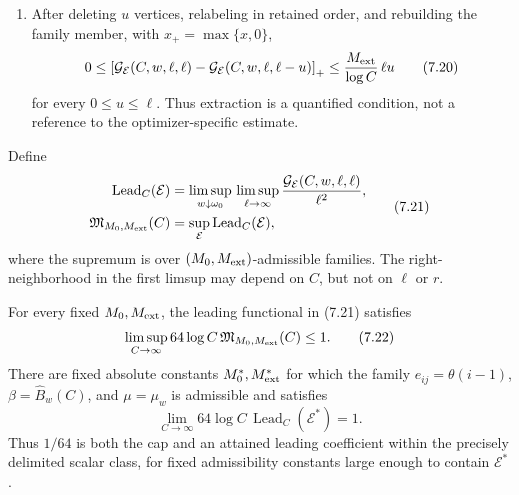 \begin{definition}
\begin{enumerate}[label=(A\arabic*)]
\[
 \mathcal G_{\mathcal E}(C,w,\ell,r)
 =\frac1d\left[
 \beta_{C,w,\ell,r}\sum_{i=1}^{r-1}S_i
 -\frac1{2\mu_{C,w,\ell,r}}
  \sum_{1\le i<j\le r}e_{ij}^2\right].
\tag{7.19}
\]
This definition excludes adaptive weights, matrix-valued completion, and
unlisted source credits.
\item After deleting \(u\) vertices, relabeling in retained order, and
rebuilding the family member, with \(x_+=\max\{x,0\}\),
\[
 0\le
 \left[
 \mathcal G_{\mathcal E}(C,w,\ell,\ell)
 -\mathcal G_{\mathcal E}(C,w,\ell,\ell-u)
 \right]_+
 \le\frac{M_{\rm ext}}{\log C}\,\ell u
\tag{7.20}
\]
for every \(0\le u\le\ell\).  Thus extraction is a quantified condition,
not a reference to the optimizer-specific estimate.
\end{enumerate}
Define
\[
\begin{aligned}
 \operatorname{Lead}_C(\mathcal E)
 &=\limsup_{w\downarrow\omega_0}\,
   \limsup_{\ell\to\infty}
   \frac{\mathcal G_{\mathcal E}(C,w,\ell,\ell)}{\ell^2},\\
 \mathfrak M_{M_0,M_{\rm ext}}(C)
 &=\sup_{\mathcal E}\operatorname{Lead}_C(\mathcal E),
\end{aligned}
\tag{7.21}
\]
where the supremum is over \((M_0,M_{\rm ext})\)-admissible families.  The
right-neighborhood in the first limsup may depend on \(C\), but not on
\(\ell\) or \(r\).
\end{definition}

\begin{proposition}\label{prop:method-cap}
For every fixed \(M_0,M_{\rm ext}\), the leading functional in (7.21)
satisfies
\[
 \limsup_{C\to\infty}64\log C\,
 \mathfrak M_{M_0,M_{\rm ext}}(C)\le1.
\tag{7.22}
\]
There are fixed absolute constants \(M_0^*,M_{\rm ext}^*\) for which the
family \(e_{ij}=\theta(i-1)\), \(\beta=\widehat B_w(C)\), and
\(\mu=\mu_w\) is admissible and satisfies
\[
 \lim_{C\to\infty}64\log C\,
 \operatorname{Lead}_C(\mathcal E^*)=1.
\tag{7.23}
\]
Thus \(1/64\) is both the cap and an attained leading coefficient within the
precisely delimited scalar class, for fixed admissibility constants large
enough to contain \(\mathcal E^*\).
\end{proposition}

